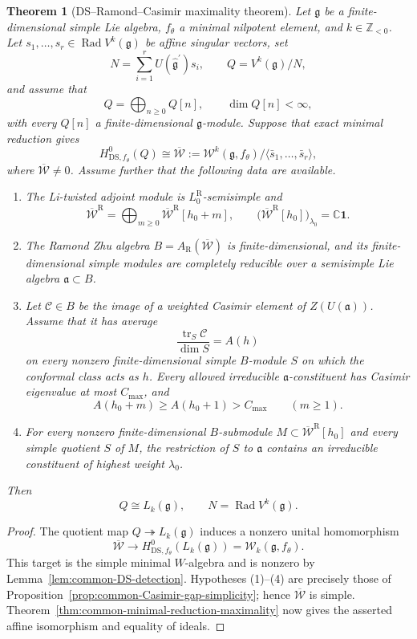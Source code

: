 \documentclass[11pt,reqno]{amsart}
\newtheorem{theorem}{Theorem}[section]
\theoremstyle{definition}
\theoremstyle{remark}
\begin{document}
\begin{theorem}[DS--Ramond--Casimir maximality theorem]
\label{thm:common-DS-Ramond-Casimir-maximality}
Let $\mathfrak g$ be a finite-dimensional simple Lie algebra,
$f_\theta$ a minimal nilpotent element, and $k\in\mathbb Z_{<0}$.  Let
$s_1,\ldots,s_r\in\operatorname{Rad}V^k(\mathfrak g)$ be affine singular
vectors, set
\[
 N=\sum_{i=1}^rU(\widehat{\mathfrak g}^{\prime})s_i,
 \qquad
 Q=V^k(\mathfrak g)/N,
\]
and assume that
\[
 Q=\bigoplus_{n\ge0}Q[n],
 \qquad \dim Q[n]<\infty,
\]
with every $Q[n]$ a finite-dimensional $\mathfrak g$-module.  Suppose that
exact minimal
reduction gives
\[
 H^0_{\mathrm{DS},f_\theta}(Q)
 \cong
 \overline{\mathcal W}
 :=\mathcal W^k(\mathfrak g,f_\theta)
   \big/\langle\bar s_1,\ldots,\bar s_r\rangle,
\]
where $\overline{\mathcal W}\ne0$.  Assume further that the following data
are available.
\begin{enumerate}
\item The Li-twisted adjoint module is $L_0^{\mathrm R}$-semisimple and
\[
 \overline{\mathcal W}^{\mathrm R}
 =\bigoplus_{m\ge0}\overline{\mathcal W}^{\mathrm R}[h_0+m],
 \qquad
 \bigl(\overline{\mathcal W}^{\mathrm R}[h_0]\bigr)_{\lambda_0}
 =\mathbb C\mathbf1.
\]
\item The Ramond Zhu algebra $B=A_{\mathrm R}(\overline{\mathcal W})$ is
finite-dimensional, and its finite-dimensional simple modules are completely
reducible over a semisimple Lie algebra $\mathfrak a\subset B$.
\item Let $\mathcal C\in B$ be the image of a weighted Casimir element of
$Z(U(\mathfrak a))$.  Assume that it has average
\[
 \frac{\operatorname{tr}_S\mathcal C}{\dim S}=A(h)
\]
on every nonzero finite-dimensional simple $B$-module $S$ on which the
conformal class acts as $h$.  Every allowed irreducible
$\mathfrak a$-constituent has Casimir eigenvalue at most $C_{\max}$, and
\[
 A(h_0+m)\ge A(h_0+1)>C_{\max}
 \qquad(m\ge1).
\]
\item For every nonzero finite-dimensional $B$-submodule
$M\subset\overline{\mathcal W}^{\mathrm R}[h_0]$ and every simple quotient
$S$ of $M$, the restriction of $S$ to $\mathfrak a$ contains an irreducible
constituent of highest weight $\lambda_0$.
\end{enumerate}
Then
\[
 Q\cong L_k(\mathfrak g),
 \qquad
 N=\operatorname{Rad}V^k(\mathfrak g).
\]
\end{theorem}

\begin{proof}
The quotient map $Q\twoheadrightarrow L_k(\mathfrak g)$ induces a nonzero
unital homomorphism
\[
 \overline{\mathcal W}
 \longrightarrow
 H^0_{\mathrm{DS},f_\theta}(L_k(\mathfrak g))
 =\mathcal W_k(\mathfrak g,f_\theta).
\]
This target is the simple minimal $W$-algebra and is nonzero by
Lemma~\ref{lem:common-DS-detection}.  Hypotheses
(1)--(4) are precisely those of
Proposition~\ref{prop:common-Casimir-gap-simplicity}; hence
$\overline{\mathcal W}$ is simple.
Theorem~\ref{thm:common-minimal-reduction-maximality} now gives the asserted
affine isomorphism and equality of ideals.
\end{proof}
\end{document}

